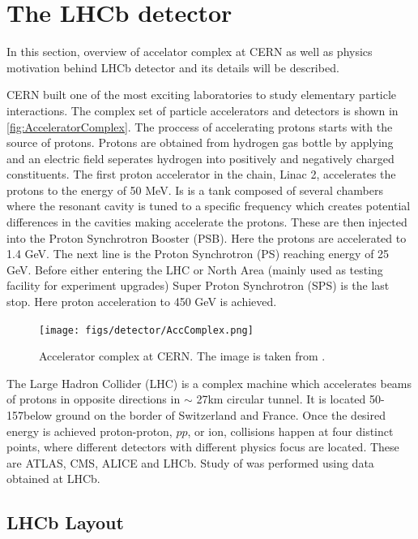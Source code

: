 \chapter{The LHCb detector}
\label{chap:dec}
In this section, overview of accelator complex at CERN as well as physics motivation behind \Gls{LHCb} detector and its details will be described.

CERN built one of the most exciting laboratories to study elementary particle interactions. The complex set of particle accelerators and detectors is shown in \autoref{fig:AcceleratorComplex}. The proccess of accelerating protons starts with the source of protons. Protons are obtained from hydrogen gas bottle by applying and an electric field seperates hydrogen into positively and negatively charged constituents. The first proton accelerator in the chain, Linac 2, accelerates the protons to the energy of 50 MeV. Is is a tank composed of several chambers where the resonant cavity is tuned to a specific frequency which creates potential differences in the cavities making accelerate the protons. These are then injected into the Proton Synchrotron Booster (PSB). Here the protons are accelerated to 1.4 GeV. The next line is the Proton Synchrotron (PS) reaching energy of 25 GeV. Before either entering the LHC or North Area (mainly used as testing facility for experiment upgrades) Super Proton Synchrotron (SPS) is the last stop. Here proton acceleration to 450 GeV is achieved.

\begin{figure}
  \centering
  \texttt{[image: figs/detector/AccComplex.png]}
	\caption{Accelerator complex at CERN. The image is taken from \cite{complex}.}
  \label{fig:AcceleratorComplex}
\end{figure}

The Large Hadron Collider (LHC) is a complex machine which accelerates beams of protons in opposite directions in $\sim$ 27km circular tunnel. It is located
50-157\m below ground on the border of Switzerland and France. Once the desired energy is achieved proton-proton, $pp$, or ion, collisions happen at four distinct points, where different detectors with different physics focus are located. These are \Gls{ATLAS}, \Gls{CMS}, \Gls{ALICE} and \Gls{LHCb}. 
Study of \Bmumumu was performed using data obtained at \Gls{LHCb}. 

\section{LHCb Layout}

